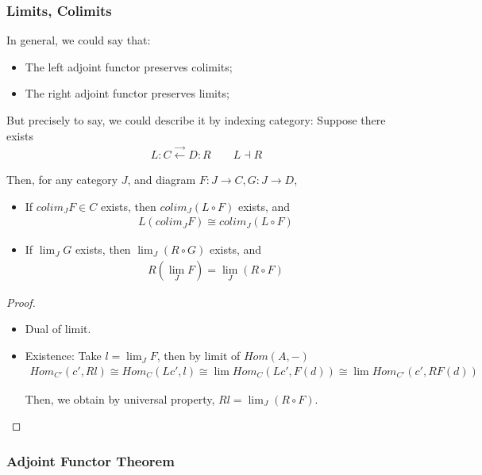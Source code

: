 \documentclass[Total.tex]{subfiles}
\begin{document}
			\subsubsection{Limits, Colimits}
				\begin{theorem} In general, we could say that: 
					\begin{itemize}
						\item The left adjoint functor preserves colimits;
						\item The right adjoint functor preserves limits;
					\end{itemize}
					
					But precisely to say, we could describe it by indexing category: Suppose there exists
					\begin{gather*}
						L:C\stackrel{\rightarrow}{\leftarrow} D:R\qquad L\dashv R
					\end{gather*}
					
					Then, for any category $J$, and diagram $F:J\rightarrow C,G:J\rightarrow D$, 
					\begin{itemize}
						\item If $colim_J F\in C$ exists, then $colim_J(L\circ F)$ exists, and
						\begin{gather*}
							L(colim_J F)\cong colim_J(L\circ F)
						\end{gather*}
						\item If $\lim_J G$ exists, then $\lim_J(R\circ G)$ exists, and 
						\begin{gather*}
							R(\lim_J F)=\lim_J(R\circ F)
						\end{gather*}
					\end{itemize}
				\end{theorem}
				\begin{proof}
					\begin{itemize}
						\item Dual of limit. 
						\item Existence: Take $l=\lim_J F$, then by limit of $Hom(A,-)$
						\begin{gather*}
							Hom_{C'}(c',Rl)\cong Hom_{C}(Lc',l)\cong \lim Hom_C(Lc',F(d))\cong \lim Hom_{C'}(c',RF(d))
						\end{gather*}
						
						Then, we obtain by universal property, $Rl=\lim_J (R\circ F)$.
					\end{itemize}
				\end{proof}
			\subsubsection{Adjoint Functor Theorem}
				
\end{document}
